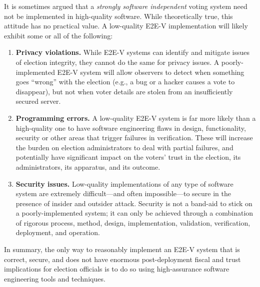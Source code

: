It is sometimes argued that a \emph{strongly software independent}
voting system need not be implemented in high-quality software. While
theoretically true, this attitude has no practical value. A
low-quality E2E-V implementation will likely exhibit some or all of
the following:

\begin{enumerate}
\item \textbf{Privacy violations.} While E2E-V systems can identify
  and mitigate issues of election integrity, they cannot do the same
  for privacy issues. A poorly-implemented E2E-V system will allow
  observers to detect when something goes ``wrong'' with the election
  (e.g., a bug or a hacker causes a vote to disappear), but not when
  voter details are stolen from an insufficiently secured server.
\item \textbf{Programming errors.} A low-quality E2E-V system is far
  more likely than a high-quality one to have software engineering
  flaws in design, functionality, security or other areas that trigger
  failures in verification. These will increase the burden on election
  administrators to deal with partial failures, and potentially have
  significant impact on the voters' trust in the election, its
  administrators, its apparatus, and its outcome.
\item \textbf{Security issues.} Low-quality implementations of any
  type of software system are extremely difficult---and often
  impossible---to secure in the presence of insider and outsider
  attack. Security is not a band-aid to stick on a poorly-implemented
  system; it can only be achieved through a combination of rigorous
  process, method, design, implementation, validation, verification,
  deployment, and operation.
\end{enumerate}

In summary, the only way to reasonably implement an E2E-V system that
is correct, secure, and does not have enormous post-deployment fiscal
and trust implications for election officials is to do so using
high-assurance software engineering tools and techniques.

